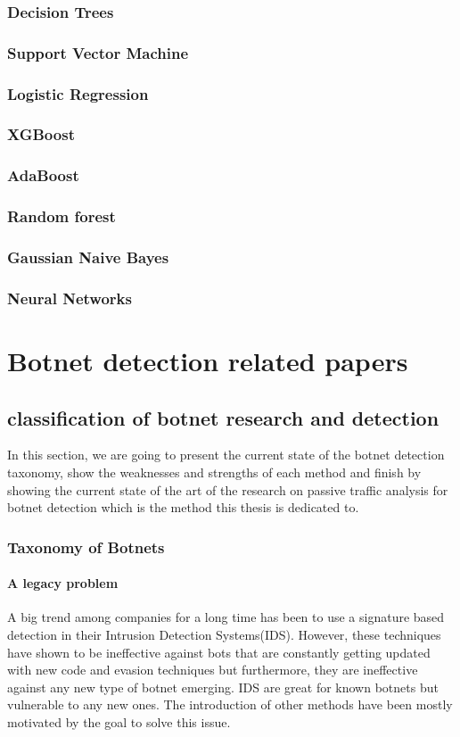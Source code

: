 \subsubsection{Decision Trees}
\subsubsection{Support Vector Machine}
\subsubsection{Logistic Regression}
\subsubsection{XGBoost}
\subsubsection{AdaBoost}
\subsubsection{Random forest}
\subsubsection{Gaussian Naive Bayes}
\subsubsection{Neural Networks}

\section{Botnet detection related papers}
\subsection{classification of botnet research and detection}
In this section, we are going to present the current state of the botnet detection taxonomy, show the weaknesses and strengths of each method and finish by showing the current state of the art of the research on passive traffic analysis for botnet detection which is the method this thesis is dedicated to.\\

\subsubsection{Taxonomy of Botnets}
\paragraph{A legacy problem} A big trend among companies for a long time has been to use a signature based detection in their Intrusion Detection Systems(IDS)\cite{bot-ml}. However, these techniques have shown to be ineffective against bots that are constantly getting updated with new code and evasion techniques but furthermore, they are ineffective against any new type of botnet emerging. IDS are great for known botnets but vulnerable to any new ones\cite{snort}. The introduction of other methods have been mostly motivated by the goal to solve this issue.

